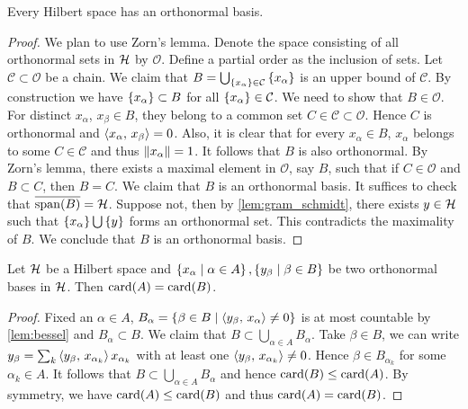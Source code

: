 \begin{theorem}
    Every Hilbert space has an orthonormal basis.
\end{theorem}
\begin{proof}
    We plan to use Zorn's lemma. Denote the space consisting of all orthonormal 
    sets in $\mathcal{H}$ by $\mathcal{O}$. Define a partial order as the inclusion of 
    sets. Let $\mathcal{C}\subset\mathcal{O}$ be a chain. We claim that 
    $B = \bigcup_{\left\{ {x_\alpha} \right\}\in\mathcal{C}}\left\{ {x_\alpha} \right\}$ is an upper bound 
    of $\mathcal{C}$. By construction we have $\left\{ {x_\alpha} \right\}\subset B$ for all 
    $\left\{ {x_\alpha} \right\}\in\mathcal{C}$. We need to show that $B\in\mathcal{O}$. For 
    distinct $x_\alpha$, $x_\beta\in B$, they belong to a common set 
    $C\in\mathcal{C}\subset\mathcal{O}$. Hence $C$ is orthonormal and 
    $\left\langle {x_\alpha},\, {x_\beta} \right\rangle = 0$. Also, it is clear that for every $x_\alpha\in B$, 
    $x_\alpha$ belongs to some $C\in\mathcal{C}$ and thus $\left\lVert {x_\alpha} \right\rVert = 1$. 
    It follows that $B$ is also orthonormal. By Zorn's lemma, there exists a 
    maximal element in $\mathcal{O}$, say $B$, such that if $C\in\mathcal{O}$ 
    and $B\subset C$, then $B = C$. We claim that $B$ is an orthonormal basis. 
    It suffices to check that $\overline{\operatorname{span}(B)} = \mathcal{H}$. Suppose not, then 
    by \cref{lem:gram_schmidt}, there exists $y\in\mathcal{H}$ such that $\left\{ {x_\alpha} \right\}\bigcup\left\{ {y} \right\}$ 
    forms an orthonormal set. This contradicts the maximality of $B$. We 
    conclude that $B$ is an orthonormal basis.
\end{proof}

\begin{proposition}
    Let $\mathcal{H}$ be a Hilbert space and $\left\{ x_\alpha \;\middle\vert\; \alpha\in A \right\},\left\{ y_\beta \;\middle\vert\; \beta\in B \right\}$ 
    be two orthonormal bases in $\mathcal{H}$. Then $\operatorname{card}(A) = \operatorname{card}(B)$.
\end{proposition}
\begin{proof}
    Fixed an $\alpha\in A$, $B_\alpha = \left\{ \beta\in B \;\middle\vert\; \left\langle {y_\beta},\, {x_\alpha} \right\rangle\neq 0 \right\}$ 
    is at most countable by \cref{lem:bessel} and $B_\alpha\subset B$. We 
    claim that $B\subset\bigcup_{\alpha\in A}B_\alpha$. Take $\beta\in B$, 
    we can write $y_\beta = \sum_k \left\langle {y_\beta},\, {x_{\alpha_k}} \right\rangle x_{\alpha_k}$ with 
    at least one $\left\langle {y_\beta},\, {x_{\alpha_k}} \right\rangle \neq 0$. Hence $\beta\in B_{\alpha_k}$ 
    for some $\alpha_k\in A$. It follows that $B\subset\bigcup_{\alpha\in A}B_\alpha$ 
    and hence $\operatorname{card}(B)\leq \operatorname{card}(A)$. By symmetry, we have $\operatorname{card}(A)\leq \operatorname{card}(B)$ 
    and thus $\operatorname{card}(A) = \operatorname{card}(B)$.
\end{proof}

